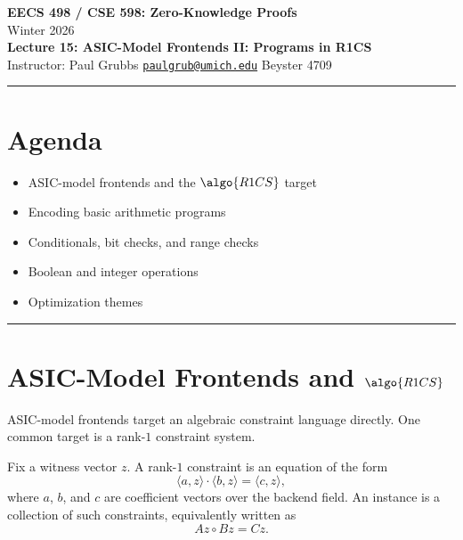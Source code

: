 \documentclass[11pt]{article}
\begin{document}
\begin{center}
  {\LARGE \textbf{EECS 498 / CSE 598: Zero-Knowledge Proofs}}\\[6pt]
  {\large Winter 2026}\\[4pt]
  {\large \textbf{Lecture 15: ASIC-Model Frontends II: Programs in R1CS}}\\[4pt]
  {\large Instructor: Paul Grubbs \quad
    \href{mailto:paulgrub@umich.edu}{\texttt{paulgrub@umich.edu}} \quad
    Beyster 4709}
\end{center}

\vspace{0.5em}
\hrule
\vspace{1em}

\section*{Agenda}
\begin{itemize}
  \item ASIC-model frontends and the $\algo{R1CS}$ target
  \item Encoding basic arithmetic programs
  \item Conditionals, bit checks, and range checks
  \item Boolean and integer operations
  \item Optimization themes
\end{itemize}

\hrule
\vspace{1em}

\section{ASIC-Model Frontends and \texorpdfstring{$\algo{R1CS}$}{R1CS}}

ASIC-model frontends target an algebraic constraint language directly.  One
common target is a rank-$1$ constraint system.

\begin{definition}
Fix a witness vector $z$.  A rank-$1$ constraint is an equation of the form
\[
  \langle a, z \rangle \cdot \langle b, z \rangle = \langle c, z \rangle,
\]
where $a$, $b$, and $c$ are coefficient vectors over the backend field.  An
 instance is a collection of such constraints, equivalently written
as
\[
  Az \circ Bz = Cz.
\]
\end{definition}
\end{document}

